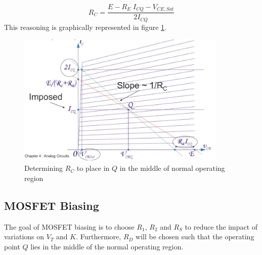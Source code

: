 \begin{equation}
	R_C = \frac{E-R_E\;I_{CQ} - V_{CE,Sat}}{2 I_{CQ}}
	\label{eq:compute_RC}
\end{equation}
This reasoning is graphically represented in figure \ref{fig:biasing2}.
\begin{figure}[h!]
	\centering
	\includegraphics[width=10cm]{figures/ch02/biasing2.jpg}
	\caption{Determining $R_C$ to place in $Q$ in the middle of normal operating region }
	\label{fig:biasing2}
\end{figure}
\subsection{MOSFET Biasing}
\label{sec:mosfet_biasing}
The goal of MOSFET biasing is to choose $R_1$, $R_2$ and $R_S$ to reduce the impact of variations on $V_{T}$ and $K$. Furthermore, $R_D$ will be chosen such that the operating point $Q$ lies in the middle of the normal operating region.\\


